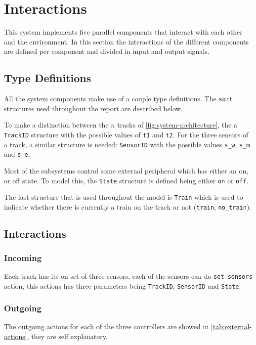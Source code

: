 \documentclass[final]{report}
\begin{document}
\chapter{Interactions}\label{ch:interactions}
This system implements five parallel components that interact with each other and the environment.
In this section the interactions of the different components are defined per component and divided in input and output signals.

\section{Type Definitions}\label{sec:interactions-typedef}
All the system components make use of a couple type definitions.
The \texttt{sort} structures used throughout the report are described below.

To make a distinction between the $n$ tracks of \cref{fig:system-architecture}, the a \texttt{TrackID} structure with the possible values of \texttt{t1} and \texttt{t2}.
For the three sensors of a track, a similar structure is needed: \texttt{SensorID} with the possible values \texttt{s\_w}, \texttt{s\_m} and \texttt{s\_e}.

Most of the subsystems control some external peripheral which has either an on, or off state.
To model this, the \texttt{State} structure is defined being either \texttt{on} or \texttt{off}.

The last structure that is used throughout the model is \texttt{Train} which is used to indicate whether there is currently a train on the track or not (\texttt{train}, \texttt{no\_train}).

\section{Interactions}\label{sec:interactions-external}
\subsection{Incoming}
Each track has its on set of three sensors, each of the sensors can do \texttt{set\_sensors} action, this actions has three parameters being \texttt{TrackID}, \texttt{SensorID} and \texttt{State}.

\subsection{Outgoing}
The outgoing actions for each of the three controllers are showed in \cref{tab:external-actions}, they are self explanatory.
\end{document}
